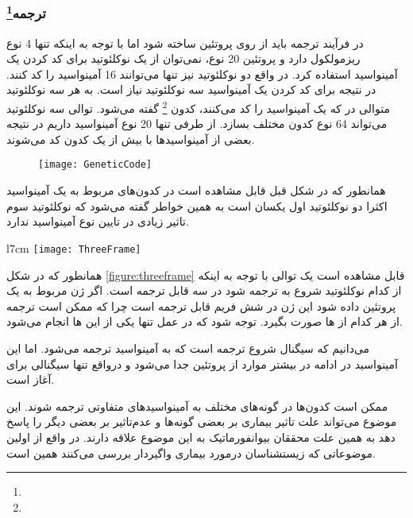 \pagebreak
\subsubsection{ترجمه\protect\footnote{}}

در فرآیند ترجمه باید از روی
پروتئین ساخته شود اما با توجه به اینکه
تنها 4 نوع ریزمولکول دارد و پروتئین
20 نوع، نمی‌توان از یک نوکلئوتید برای کد کردن یک آمینواسید‌ استفاده کرد. در واقع دو نوکلئوتید نیز تنها می‌توانند 16 آمینواسید را کد کنند. در نتیجه برای کد کردن یک آمینواسید سه نوکلئوتید نیاز است. به هر سه نوکلئوتید متوالی در
که یک آمینواسید را کد می‌کنند، کدون
\footnote{}
گفته می‌شود. توالی سه نوکلئوتید می‌تواند 64 نوع کدون مختلف بسازد. از طرفی تنها 20 نوع آمینواسید داریم در نتیجه بعضی از آمینواسید‌ها با بیش از یک کدون کد می‌شوند.

\begin{figure}[htbp]
\centering
\texttt{[image: GeneticCode]}
\end{figure}

همانطور که در شکل قبل قابل مشاهده است در کدون‌های مربوط به یک آمینواسید اکثرا دو نوکلئوتید اول یکسان است به همین خواطر گفته می‌شود که نوکلئوتید سوم تاثیر زیادی در تایین نوع آمینواسید ندارد.

\begin{wrapfigure}{l}{7cm}
\centering
\texttt{[image: ThreeFrame]}
\caption{یک توالی 
 درسه فریم می تواند به پروتئین ترجمه شود ولی یکی از آن ها عملا رخ می دهد}
\label{figure:threeframe}
\end{wrapfigure}

همانطور که در شکل
\ref{figure:threeframe}
قابل مشاهده است یک توالی
با توجه به اینکه از کدام نوکلئوتید شروع به ترجمه شود در سه
قابل ترجمه است. اگر ژن مربوط به یک پروتئین داده شود این ژن در شش فریم قابل ترجمه است چرا که ممکن است ترجمه از هر کدام از
ها صورت بگیرد.
توجه شود که در عمل تنها یکی از این
ها انجام می‌شود.

می‌دانیم که سیگنال شروع ترجمه
است که به آمینواسید
ترجمه می‌شود. اما این آمینواسید در ادامه در بیشتر موارد از پروتئین جدا می‌شود و درواقع تنها سیگنالی برای آغاز است.

ممکن است کدون‌ها در گونه‌های مختلف به آمینواسید‌های متفاوتی ترجمه شوند. این موضوع می‌تواند علت تاثیر بیماری بر بعضی گونه‌ها و عدم‌تاثیر بر بعضی دیگر را پاسخ دهد به همین علت محققان بیوانفورماتیک به این موضوع علاقه دارند. در واقع از اولین موضوعاتی که زیستشناسان درمورد بیماری واگیردار بررسی می‌کنند همین است.

